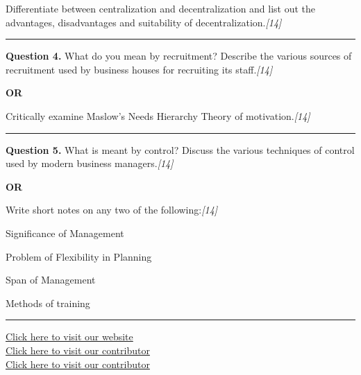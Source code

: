 \documentclass[11pt,a4paper]{article}
\newcommand{\pts}[1]{\hfill   \textit{[#1]}}
\begin{document}
Differentiate between centralization and decentralization and list out the advantages, disadvantages and suitability of decentralization.\pts{14}

\medskip\rule{\linewidth}{0.2pt}




\noindent   \textbf{Question 4.}
What do you mean by recruitment? Describe the various sources of recruitment used by business houses for recruiting its staff.\pts{14}

\centerline{   \textbf{OR}}

Critically examine Maslow's Needs Hierarchy Theory of motivation.\pts{14}

\medskip\rule{\linewidth}{0.2pt}




\noindent   \textbf{Question 5.}
What is meant by control? Discuss the various techniques of control used by modern business managers.\pts{14}

\centerline{   \textbf{OR}}

Write short notes on any two of the following:\pts{14}

\begin{parts}
  \item Significance of Management
  \item Problem of Flexibility in Planning
  \item Span of Management
  \item Methods of training
\end{parts}

\vfill
\rule{\linewidth}{0.4pt}

\begin{center}\small
\href{https://bhu-exam.vercel.app/}{Click here to visit our website}\\[4pt]
\href{https://me-aryan.vercel.app/}{Click here to visit our contributor}\\[4pt]
\href{https://quashan-me.vercel.app/}{Click here to visit our contributor}
\end{center}
\end{document}
